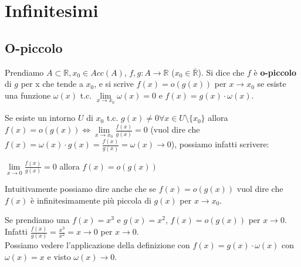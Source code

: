 \newpage
\section{Infinitesimi}
\subsection{O-piccolo}
\begin{definition}[O-piccolo]
Prendiamo $A \subset \mathbb{R}, x_0 \in Acc(A)$, $f,g: A \to \mathbb{R}$ ($x_0 \in \overline{\mathbb{R}}$). Si dice che $f$ è \textbf{o-piccolo} di $g$ per x che tende a $x_0$, e si scrive $f(x) = o(g(x))$ per $x \to x_0$ se esiste una funzione $\omega(x)$ t.c. $\lim\limits_{x \to x_0} \omega(x) = 0$ e $f(x) = g(x) \cdot \omega(x)$.
\end{definition}
\begin{observation}
Se esiste un intorno $U$ di $x_0$ t.c. $g(x) \neq 0 \forall x \in U \setminus \{x_0\}$ allora $f(x) = o(g(x)) \Longleftrightarrow \lim\limits_{x\to x_0}\frac{f(x)}{g(x)}=0$ (vuol dire che $f(x) = \omega(x) \cdot g(x) = \frac{f(x)}{g(x)} = \omega(x) \to 0$), possiamo infatti scrivere:
\begin{center}
    \vspace{-8pt}
    $\lim\limits_{x\to 0}\frac{f(x)}{g(x)} = 0$ allora $f(x) = o(g(x))$
\end{center}
\end{observation}
Intuitivamente possiamo dire anche che se $f(x) = o(g(x))$ vuol dire che $f(x)$ è infinitesimamente più piccola di $g(x)$ per $x\to x_0$.
\begin{example}
Se prendiamo una $f(x) = x^3$ e $g(x) = x^2$, $f(x) = o(g(x))$ per $x\to 0$.\\
Infatti $\frac{f(x)}{g(x)} = \frac{x^3}{x^2} = x \to 0$ per $x\to 0$.\\
Possiamo vedere l'applicazione della definizione con $f(x) = g(x) \cdot \omega(x)$ con $\omega(x) = x$ e visto $\omega(x) \to 0$.
\end{example}

